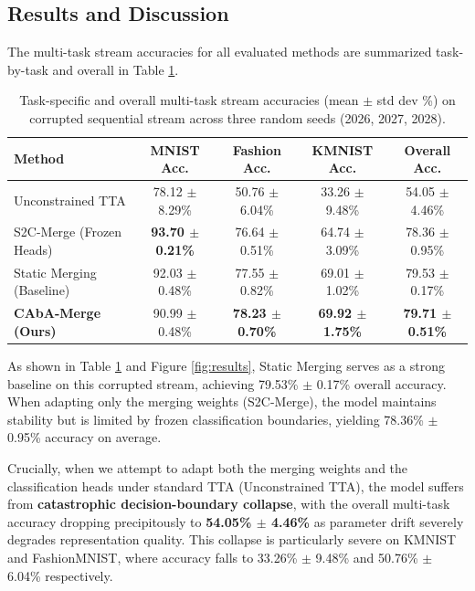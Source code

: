 \documentclass{article}
\theoremstyle{plain}
\theoremstyle{definition}
\theoremstyle{remark}
\begin{document}
\subsection{Results and Discussion}
The multi-task stream accuracies for all evaluated methods are summarized task-by-task and overall in Table \ref{tab:results}.

\begin{table}[t]
\caption{Task-specific and overall multi-task stream accuracies (mean $\pm$ std dev \%) on corrupted sequential stream across three random seeds (2026, 2027, 2028).}
\label{tab:results}
\begin{center}
\begin{tabular}{lcccc}
\toprule
\textbf{Method} & \textbf{MNIST Acc.} & \textbf{Fashion Acc.} & \textbf{KMNIST Acc.} & \textbf{Overall Acc.} \\
\midrule
Unconstrained TTA & 78.12 $\pm$ 8.29\% & 50.76 $\pm$ 6.04\% & 33.26 $\pm$ 9.48\% & 54.05 $\pm$ 4.46\% \\
S2C-Merge (Frozen Heads) & \textbf{93.70 $\pm$ 0.21\%} & 76.64 $\pm$ 0.51\% & 64.74 $\pm$ 3.09\% & 78.36 $\pm$ 0.95\% \\
Static Merging (Baseline) & 92.03 $\pm$ 0.48\% & 77.55 $\pm$ 0.82\% & 69.01 $\pm$ 1.02\% & 79.53 $\pm$ 0.17\% \\
\midrule
\textbf{CAbA-Merge (Ours)} & 90.99 $\pm$ 0.48\% & \textbf{78.23 $\pm$ 0.70\%} & \textbf{69.92 $\pm$ 1.75\%} & \textbf{79.71 $\pm$ 0.51\%} \\
\bottomrule
\end{tabular}
\end{center}
\end{table}

As shown in Table \ref{tab:results} and Figure \ref{fig:results}, Static Merging serves as a strong baseline on this corrupted stream, achieving 79.53\% $\pm$ 0.17\% overall accuracy. When adapting only the merging weights (S2C-Merge), the model maintains stability but is limited by frozen classification boundaries, yielding 78.36\% $\pm$ 0.95\% accuracy on average.

Crucially, when we attempt to adapt both the merging weights and the classification heads under standard TTA (Unconstrained TTA), the model suffers from \textbf{catastrophic decision-boundary collapse}, with the overall multi-task accuracy dropping precipitously to \textbf{54.05\% $\pm$ 4.46\%} as parameter drift severely degrades representation quality. This collapse is particularly severe on KMNIST and FashionMNIST, where accuracy falls to 33.26\% $\pm$ 9.48\% and 50.76\% $\pm$ 6.04\% respectively.
\end{document}
